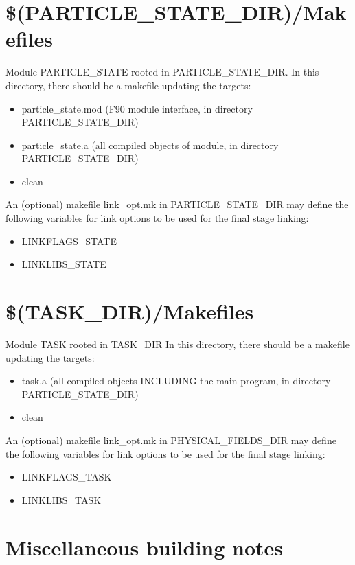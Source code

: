 \section{\$(PARTICLE\_STATE\_DIR)/Makefiles }

  
Module PARTICLE\_STATE rooted in PARTICLE\_STATE\_DIR. In this directory, there
should be a makefile updating the targets:
\begin{itemize}
  \item particle\_state.mod (F90 module interface, in directory PARTICLE\_STATE\_DIR)
  \item particle\_state.a   (all compiled objects of module, in directory PARTICLE\_STATE\_DIR)
  \item clean 
\end{itemize}  
An (optional) makefile link\_opt.mk in PARTICLE\_STATE\_DIR may define the following 
variables for link options to be used for the final stage linking:
\begin{itemize}
  \item LINKFLAGS\_STATE
  \item LINKLIBS\_STATE
\end{itemize}  

\section{\$(TASK\_DIR)/Makefiles }

Module TASK rooted in TASK\_DIR  In this directory, there
should be a makefile updating the targets:
\begin{itemize}
  \item task.a (all compiled objects INCLUDING the main program, in directory PARTICLE\_STATE\_DIR)
  \item  clean
\end{itemize}  
An (optional) makefile link\_opt.mk in PHYSICAL\_FIELDS\_DIR may define the following 
variables for link options to be used for the final stage linking:
\begin{itemize}
  \item  LINKFLAGS\_TASK
  \item  LINKLIBS\_TASK    
\end{itemize}  
 

\section{Miscellaneous building notes} 

